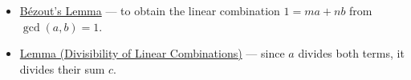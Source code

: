 \begin{remark*}[Dependencies]
\begin{itemize}
    \item \hyperref[cor:bezout-lemma]{Bézout's Lemma} — to obtain the
          linear combination $1 = ma + nb$ from $\gcd(a,b) = 1$.
    \item \hyperref[lem:div-linear-combo]{Lemma (Divisibility of Linear
          Combinations)} — since $a$ divides both terms, it divides
          their sum $c$.
\end{itemize}
\end{remark*}